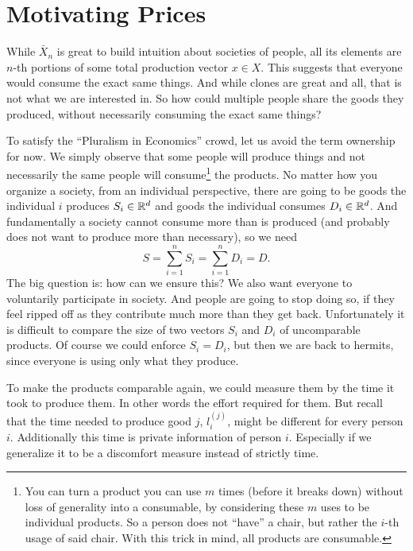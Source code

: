 \section{Motivating Prices}

While \(\bar{X}_n\) is great to build intuition about societies of people, all
its elements are \(n\)-th portions of some total production vector \(x\in X\).
This suggests that everyone would consume the exact same things. And while
clones are great and all, that is not what we are interested in. So how could
multiple people share the goods they produced, without necessarily consuming the
exact same things? 

To satisfy the ``Pluralism in Economics'' crowd, let us avoid
the term ownership for now. We simply observe that some people will produce
things and not necessarily the same people will consume\footnote{
	You can turn a product you can use \(m\) times (before it breaks down)
	without loss of generality into a consumable, by considering these \(m\) uses
	to be individual products. So a person does not ``have'' a chair, but rather
	the \(i\)-th usage of said chair. With this trick in mind, all products are
	consumable.
} the products.
No matter how you organize a society, from an individual perspective, there
are going to be goods the individual \(i\) produces \(S_i\in\mathbb{R}^d\) and
goods the individual consumes \(D_i\in\mathbb{R}^d\). And fundamentally a
society cannot consume more than is produced (and probably does not want to
produce more than necessary), so we need
\[
	S = \sum_{i=1}^n S_i = \sum_{i=1}^n D_i = D.
\]
The big question is: how can we ensure this? We also want everyone to
voluntarily participate in society. And people are going to stop doing so, if
they feel ripped off as they contribute much more than they get back.
Unfortunately it is difficult to compare the size of two vectors \(S_i\) and
\(D_i\) of uncomparable products. Of course we could enforce \(S_i=D_i\), but
then we are back to hermits, since everyone is using only what they produce.

To make the products comparable again, we could measure them by the time it took
to produce them. In other words the effort required for them. But recall that
the time needed to produce good \(j\), \(l_i^{(j)}\), might be different for
every person \(i\). Additionally this time is private information of person
\(i\). Especially if we generalize it to be a discomfort measure instead of
strictly time.


